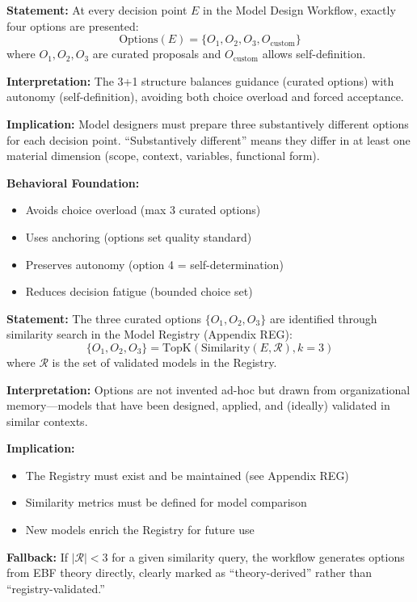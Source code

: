 \begin{tcolorbox}[colback=gray!5!white, colframe=gray!75!black,
    title=Axiom MD-1: 3+1 Choice Architecture]
\textbf{Statement:} At every decision point $E$ in the Model Design Workflow,
exactly four options are presented:
\begin{equation}
\text{Options}(E) = \{O_1, O_2, O_3, O_{\text{custom}}\}
\end{equation}
where $O_1, O_2, O_3$ are curated proposals and $O_{\text{custom}}$ allows
self-definition.

\textbf{Interpretation:} The 3+1 structure balances guidance (curated options)
with autonomy (self-definition), avoiding both choice overload and forced acceptance.

\textbf{Implication:} Model designers must prepare three substantively different
options for each decision point. ``Substantively different'' means they differ
in at least one material dimension (scope, context, variables, functional form).

\textbf{Behavioral Foundation:}
\begin{itemize}[nosep]
\item Avoids choice overload (max 3 curated options)
\item Uses anchoring (options set quality standard)
\item Preserves autonomy (option 4 = self-determination)
\item Reduces decision fatigue (bounded choice set)
\end{itemize}
\end{tcolorbox}

\begin{tcolorbox}[colback=gray!5!white, colframe=gray!75!black,
    title=Axiom MD-2: Registry-Based Option Selection]
\textbf{Statement:} The three curated options $\{O_1, O_2, O_3\}$ are identified
through similarity search in the Model Registry (Appendix REG):
\begin{equation}
\{O_1, O_2, O_3\} = \text{TopK}\left(\text{Similarity}(E, \mathcal{R}), k=3\right)
\end{equation}
where $\mathcal{R}$ is the set of validated models in the Registry.

\textbf{Interpretation:} Options are not invented ad-hoc but drawn from
organizational memory---models that have been designed, applied, and
(ideally) validated in similar contexts.

\textbf{Implication:}
\begin{itemize}[nosep]
\item The Registry must exist and be maintained (see Appendix REG)
\item Similarity metrics must be defined for model comparison
\item New models enrich the Registry for future use
\end{itemize}

\textbf{Fallback:} If $|\mathcal{R}| < 3$ for a given similarity query,
the workflow generates options from EBF theory directly, clearly marked
as ``theory-derived'' rather than ``registry-validated.''
\end{tcolorbox}

